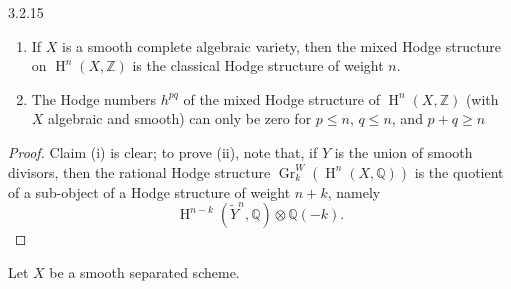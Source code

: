 \begin{corollary}{3.2.15}
\begin{enumerate}
 \item[(i)]
      If \(X\) is a smooth complete algebraic variety, then the mixed Hodge structure on \(\operatorname {H}^n(X,\mathbb {Z})\) is the classical Hodge structure of weight \(n\).
    


    
 \item[(ii)]
      The Hodge numbers \(h^{pq}\) of the mixed Hodge structure of \(\operatorname {H}^n(X,\mathbb {Z})\) (with \(X\) algebraic and smooth) can only be zero for \(p\leqslant  n\), \(q\leqslant  n\), and \(p+q\geqslant  n\)
    

  \end{enumerate}\begin{proof}\par{}Claim (i) is clear;
      to prove (ii), note that, if \(Y\) is the union of smooth divisors, then the rational Hodge structure \(\operatorname {Gr}_k^W(\operatorname {H}^n(X,\mathbb {Q}))\) is the quotient of a sub-object of a Hodge structure of weight \(n+k\), namely
      \[         \operatorname {H}^{n-k}(\widetilde {Y}^n,\mathbb {Q})\otimes \mathbb {Q}(-k).       \]\end{proof}\end{corollary}\label{hodge-theory-ii-3.2.16}\par{}Let \(X\) be a smooth separated scheme.
